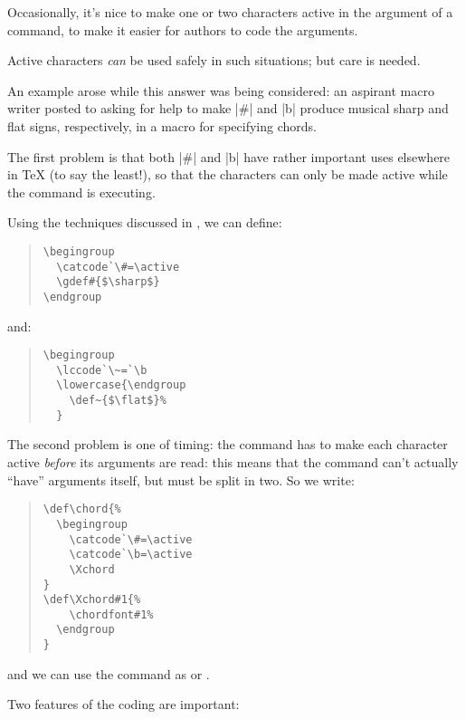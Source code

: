 
Occasionally, it's nice to make one or two characters active in the
argument of a command, to make it easier for authors to code the
arguments.

Active characters \emph{can} be used safely in such situations; but
care is needed.

An example arose while this answer was being considered: an aspirant
macro writer posted to  asking for help to
make |#| and |b| produce musical sharp and flat signs, respectively,
in a macro for specifying chords.

The first problem is that both |#| and |b| have rather important uses
elsewhere in \TeX{} (to say the least!), so that the characters can
only be made active while the command is executing.

Using the techniques discussed in %
,
we can define:
\begin{quote}
\begin{verbatim}
\begingroup
  \catcode`\#=\active
  \gdef#{$\sharp$}
\endgroup
\end{verbatim}
\end{quote}
and:
\begin{quote}
\begin{verbatim}
\begingroup
  \lccode`\~=`\b
  \lowercase{\endgroup
    \def~{$\flat$}%
  }
\end{verbatim}
\end{quote}
The second problem is one of timing: the command has to make each
character active \emph{before} its arguments are read: this means that
the command can't actually ``have'' arguments itself, but must be
split in two.  So we write:
\begin{quote}
\begin{verbatim}
\def\chord{%
  \begingroup
    \catcode`\#=\active
    \catcode`\b=\active
    \Xchord
}
\def\Xchord#1{%
    \chordfont#1%
  \endgroup
}
\end{verbatim}
\end{quote}
and we can use the command as  or
.

Two features of the coding are important:

